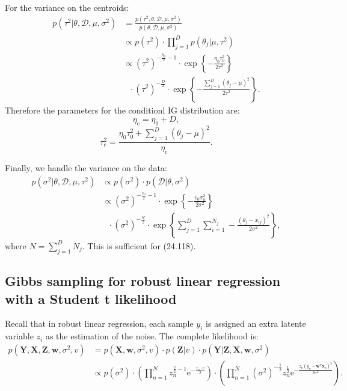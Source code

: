 \documentclass[UTF8]{ctexart}
\begin{document}
For the variance on the centroids:
$$
\begin{aligned}
p(\tau^{2}|\theta,\mathcal{D},\mu,\sigma^{2})&=\frac{p(\tau^{2},\theta,\mathcal{D},\mu,\sigma^{2})}{p(\theta,\mathcal{D},\mu,\sigma^{2})}\\
&\propto p(\tau^{2})\cdot \prod_{j=1}^{D}p(\theta_{j}|\mu,\tau^{2})\\
&\propto(\tau^{2})^{-\frac{\eta_{0}}{2}-1}\cdot\exp\left\{-\frac{\eta_{0}\tau^{2}_{0}}{2\tau^{2}} \right\}\\
&\ \ \ \cdot (\tau^{2})^{-\frac{D}{2}}\cdot\exp\left\{-\frac{\sum_{j=1}^{D}(\theta_{j}-\mu)^{2}}{2\tau^{2}} \right\}.
\end{aligned}
$$
Therefore the parameters for the conditionl IG distribution are:
$$\eta_{\text{c}}=\eta_{0}+D,$$
$$\tau_{\text{c}}^{2}=\frac{\eta_{0}\tau^{2}_{0}+\sum_{j=1}^{D}(\theta_{j}-\mu)^{2}}{\eta_{\text{c}}}.$$

Finally, we handle the variance on the data:
$$
\begin{aligned}
p(\sigma^{2}|\theta,\mathcal{D},\mu,\tau^{2})&\propto p(\sigma^{2})\cdot p(\mathcal{D}|\theta,\sigma^{2})\\
&\propto (\sigma^{2})^{-\frac{v_{0}}{2}-1}\cdot\exp\left\{-\frac{v_{0}\sigma^{2}_{0}}{2\sigma^{2}} \right\}\\
&\ \ \ \cdot (\sigma^{2})^{-\frac{N}{2}}\cdot \exp\left\{\sum_{j=1}^{D}\sum_{i=1}^{N_{j}}-\frac{(\theta_{j}-x_{ij})^{2}}{2\sigma^{2}} \right\},
\end{aligned}
$$
where $N=\sum_{j=1}^{D}N_{j}$.
This is sufficient for (24.118). \

\subsection{Gibbs sampling for robust linear regression with a Student t likelihood}
Recall that in robust linear regression, each sample $y_{i}$ is assigned an extra latente variable $z_{i}$ as the estimation of the noise. 
The complete likelihood is:
$$
\begin{aligned}
p(\textbf{Y},\textbf{X},\textbf{Z},\textbf{w},\sigma^{2},v)&=p(\textbf{X},\textbf{w},\sigma^{2},v)\cdot p(\textbf{Z}|v)\cdot p(\textbf{Y}|\textbf{Z},\textbf{X},\textbf{w},\sigma^{2})\\
&\propto p(\sigma^{2})\cdot \left(\prod_{n=1}^{N}z_{n}^{\frac{v}{2}-1}\text{e}^{-\frac{z_{n}\cdot v}{2}}\right)\cdot \left(\prod_{n=1}^{N}(\sigma^{2})^{-\frac{1}{2}}z_{n}^{\frac{1}{2}}\text{e}^{-\frac{z_{n}(y_{n}-\textbf{w}^{\text{T}}\textbf{x}_{n})^{2}}{2\sigma^{2}}} \right).
\end{aligned}
$$
\end{document}
